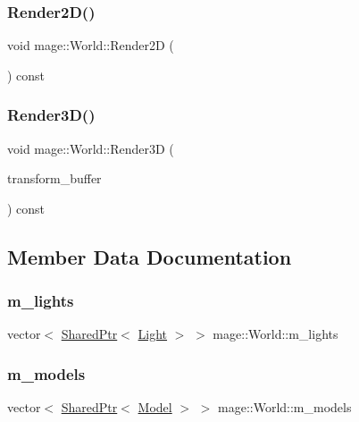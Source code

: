 \subsubsection{\texorpdfstring{Render2\+D()}{Render2D()}}
{\footnotesize\ttfamily void mage\+::\+World\+::\+Render2D (\begin{DoxyParamCaption}{ }\end{DoxyParamCaption}) const}

\hypertarget{classmage_1_1_world_a6d5a6fe97bf24c174d9c8f544be34d13}{}\label{classmage_1_1_world_a6d5a6fe97bf24c174d9c8f544be34d13} 
\subsubsection{\texorpdfstring{Render3\+D()}{Render3D()}}
{\footnotesize\ttfamily void mage\+::\+World\+::\+Render3D (\begin{DoxyParamCaption}\item[{const Transform\+Buffer \&}]{transform\+\_\+buffer }\end{DoxyParamCaption}) const}



\subsection{Member Data Documentation}
\hypertarget{classmage_1_1_world_a5010756f3403c5f0f9ed7120a83da3f6}{}\label{classmage_1_1_world_a5010756f3403c5f0f9ed7120a83da3f6} 
\subsubsection{\texorpdfstring{m\+\_\+lights}{m\_lights}}
{\footnotesize\ttfamily vector$<$ \hyperlink{namespacemage_a1e01ae66713838a7a67d30e44c67703e}{Shared\+Ptr}$<$ \hyperlink{classmage_1_1_light}{Light} $>$ $>$ mage\+::\+World\+::m\+\_\+lights\hspace{0.3cm}{\ttfamily [private]}}

\hypertarget{classmage_1_1_world_ad69d681d960e32f62800bfcfa88d7737}{}\label{classmage_1_1_world_ad69d681d960e32f62800bfcfa88d7737} 
\subsubsection{\texorpdfstring{m\+\_\+models}{m\_models}}
{\footnotesize\ttfamily vector$<$ \hyperlink{namespacemage_a1e01ae66713838a7a67d30e44c67703e}{Shared\+Ptr}$<$ \hyperlink{classmage_1_1_model}{Model} $>$ $>$ mage\+::\+World\+::m\+\_\+models\hspace{0.3cm}{\ttfamily [private]}}

